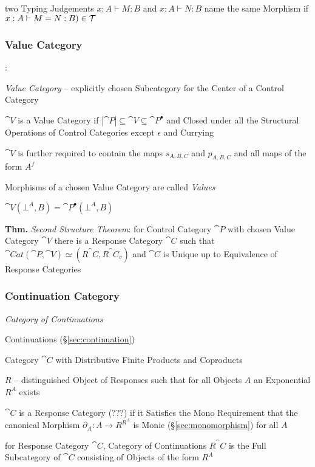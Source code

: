 two Typing Judgements $x:A \vdash M:B$ and $x:A \vdash N:B$ name the
same Morphism if $x:A \vdash M = N:B) \in \mathcal{T}$



\subsubsection{Value Category}\label{sec:value_category}

\cite{selinger01}:

\emph{Value Category} -- explicitly chosen Subcategory for the Center
of a Control Category

$\cat{V}$ is a Value Category if $|\cat{P}| \subseteq \cat{V}
\subseteq \cat{P}^\bullet$ and Closed under all the Structural
Operations of Control Categories except $\epsilon$ and Currying

$\cat{V}$ is further required to contain the maps $s_{A,B,C}$ and
$p_{A,B,C}$ and all maps of the form $A^f$

Morphisms of a chosen Value Category are called \emph{Values}

$\cat{V}(\bot^A,B) = \cat{P}^\bullet(\bot^A,B)$

\textbf{Thm.} \emph{Second Structure Theorem}: for Control Category
$\cat{P}$ with chosen Value Category $\cat{V}$ there is a Response
Category $\cat{C}$ such that $\cat{Cat}(\cat{P},\cat{V}) \simeq
(R^\cat{C},R^\cat{C}_v)$ and $\cat{C}$ is Unique up to Equivalence of
Response Categories %



\subsubsection{Continuation Category}\label{sec:continuation_category}

\emph{Category of Continuations}

Continuations (\S\ref{sec:continuation})

Category $\cat{C}$ with Distributive Finite Products and Coproducts

$R$ -- distinguished Object of Responses such that for all Objects $A$
an Exponential $R^A$ exists

$\cat{C}$ is a Response Category (???) if it Satisfies the Mono
Requirement that the canonical Morphism $\partial_A: A \rightarrow
R^{R^A}$ is Monic (\S\ref{sec:monomorphism}) for all $A$

for Response Category $\cat{C}$, Category of Continuations $R^\cat{C}$
is the Full Subcategory of $\cat{C}$ consisting of Objects of the form
$R^A$

